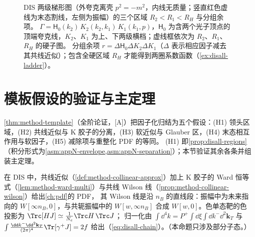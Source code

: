 \begin{figure}[htbp]
\caption{DIS 两级梯形图（外夸克离壳 $p^2=-m^2$，内线无质量；竖直红色虚线为末态割线，左侧为振幅）的三个区域 $R_2<R_1<R_H$ 与分组余项。
$\Gamma=\mathsf H_0(k_2)\,K_2(k_2,k_1)\,K_1(k_1,p)$，$\mathsf H_0$ 为含两个光子顶点的顶端夸克线，$K_2$、$K_1$ 为上、下两级横档；虚线框依次为 $R_2$、$R_1$、$R_H$ 的硬子图。
分组余项 $r=\Delta\mathsf H_0\Delta K_2\Delta K_1$（$\Delta$ 表示相应因子减去其共线近似）；包含全硬区域 $R_H$ 才能得到两圈系数函数（\cref{ex:disall-ladder}）。}
\label{fig:disall-ladder-regions}
\end{figure}

\section{模板假设的验证与主定理}\label{sec:disall-theorem}

\cref{thm:method-template}（全阶论证，[A]）把因子化归结为五个假设：(H1) 领头区域，(H2) 共线近似与 K 胶子的分离，(H3) 软近似与 Glauber 区，(H4) 末态相互作用与软因子，(H5) 减除项与重整化 PDF 的等同。
(H1) 即\cref{prop:disall-regions}（积分形式为\cref{asm:appN-envelope,asm:appN-separation}）；本节验证其余各条并组装主定理。

\begin{proposition}\label{prop:disall-h2}
在 DIS 中，共线近似（\cref{def:method-collinear-approx}）加上 K 胶子的 Ward 恒等式（\cref{lem:method-ward-multi}）与共线 Wilson 线（\cref{prop:method-collinear-wilson}）给出\cref{ch:pdf}的 PDF，
其 Wilson 线是沿 $n_B$ 的直线段：振幅中为未来指向的 $W[\infty n_B,0]$，与共轭振幅中的 $W[w,\infty n_B]$ 合成 $W[w,0]$。色单态靶的色投影为 $\Trc[HJ]\simeq\frac1{N_c}\Trc H\,\Trc J$；
归一化由 $\int\dd^4k=P^+\!\int\dd\xi\int\dd k^-\dd^2\mathbf k_T$ 与 $\int\frac{\dd k^-\dd^2\mathbf k_T}{(2\pi)^4}\Tr[\gamma^+J]=2f$ 给出（\cref{eq:disall-chain}）。（本命题只涉及部分子态。）
\end{proposition}

